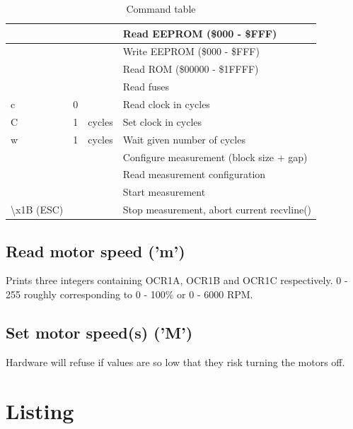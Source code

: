 \documentclass{article}
\begin{document}
\begin{table}[H]
\begin{centering}
\begin{tabular}{|p{1.8cm}|p{1.8cm}|p{1.8cm}|p{5cm}|}
  &   &                     & Read EEPROM (\$000 - \$FFF) \\ \hline
  &   &                     & Write EEPROM (\$000 - \$FFF) \\ \hline
  &   &                     & Read ROM (\$00000 - \$1FFFF) \\ \hline
  &   &                     & Read fuses \\ \hline
c & 0 &                     & Read clock in cycles \\ \hline
C & 1 & cycles              & Set clock in cycles \\ \hline
w & 1 & cycles              & Wait given number of cycles \\ \hline
  &   &                     & Configure measurement (block size + gap) \\ \hline
  &   &                     & Read measurement configuration \\ \hline
  &   &                     & Start measurement \\ \hline
{\textbackslash}x1B (ESC)  &   &                     & Stop measurement, abort current recvline() \\ \hline
\end{tabular}
\caption{Command table}
\label{command_table}
\end{centering}
\end{table}

\subsection{Read motor speed ('m')}

Prints three integers containing OCR1A, OCR1B and OCR1C respectively.
0 - 255 roughly corresponding to 0 - 100\% or 0 - 6000 RPM.

\subsection{Set motor speed(s) ('M')}

Hardware will refuse if values are so low that they risk turning the motors off.

\section{Listing}


\end{document}
